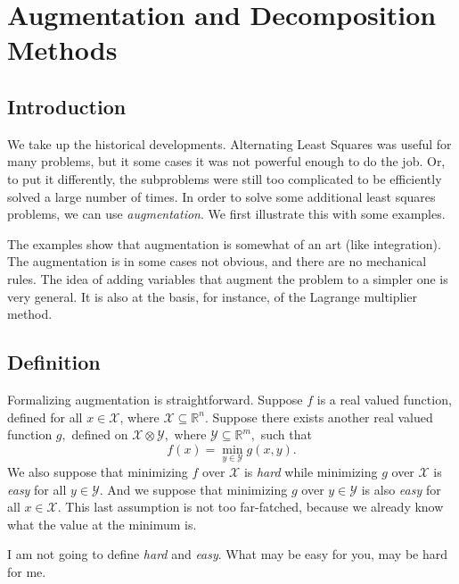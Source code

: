 \documentclass[
  12pt,
]{book}
\begin{document}
\hypertarget{augmentation-and-decomposition-methods}{%
\chapter{Augmentation and Decomposition Methods}\label{augmentation-and-decomposition-methods}}

\hypertarget{introduction-1}{%
\section{Introduction}\label{introduction-1}}

We take up the historical developments. Alternating Least
Squares was useful for many problems, but it some cases
it was not powerful enough to do the job. Or, to put it
differently, the subproblems were still too complicated
to be efficiently solved a large number of times.
In order to solve some
additional least squares problems, we can use \emph{augmentation}.
We first illustrate this with some examples.

The examples show that augmentation is somewhat of
an art (like integration). The augmentation is in some cases not obvious, and there are no mechanical rules.
The idea of adding variables
that augment the problem to a simpler one is very general. It is
also at the basis, for instance, of the Lagrange multiplier method.

\hypertarget{definition}{%
\section{Definition}\label{definition}}

Formalizing augmentation is straightforward.
Suppose \(f\) is a real valued function, defined for
all \(x\in\mathcal{X}\), where \(\mathcal{X}\subseteq\mathbb{R}^n.\)
Suppose there exists another real valued function \(g,\) defined
on \(\mathcal{X}\otimes\mathcal{Y},\) where \(\mathcal{Y}\subseteq\mathbb{R}^m,\) such that
\[
f(x)=\min_{y\in\mathcal{Y}}g(x,y).
\]
We also suppose that minimizing \(f\) over \(\mathcal{X}\)
is \emph{hard} while minimizing \(g\) over \(\mathcal{X}\) is \emph{easy} for
all \(y\in\mathcal{Y}\). And we suppose
that minimizing \(g\) over \(y\in\mathcal{Y}\)
is also \emph{easy} for all \(x\in\mathcal{X}.\)
This last assumption is not too far-fatched,
because we already know what the value at the minimum is.

I am not going to define \emph{hard} and \emph{easy}. What may
be easy for you, may be hard for me.
\end{document}
